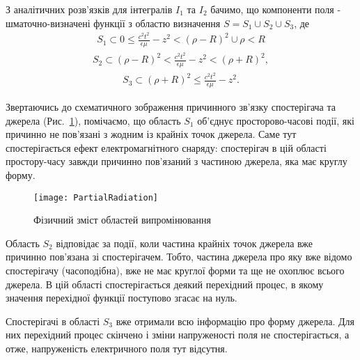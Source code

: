 З аналітичних розв'язків для інтегралів $ I_1 $ та $ I_2 $ бачимо, що 
компоненти поля - шматочно-визначені функції з областю визначення 
$ S = S_1 \cup S_2 \cup S_3 $, де
%
\begin{equation} \begin{aligned} \label{eq:s1zone}
S_1 \subset 0 \leq \frac{c^2t^2}{\epsilon \mu} - z^2 < (\rho - R)^2 
\cup \rho < R
\end{aligned} \end{equation}
%
\begin{equation} \begin{aligned} \label{eq:s2zone}
S_2 \subset (\rho - R)^2 < \frac{c^2t^2}{\epsilon \mu} - z^2 < (\rho + R)^2,
\end{aligned} \end{equation}
%
\begin{equation} \begin{aligned} \label{eq:s3zone}
S_3 \subset (\rho + R)^2 \leq \frac{c^2t^2}{\epsilon \mu} - z^2.
\end{aligned} \end{equation}

Звертаючись до схематичного зображення причинного зв'язку спостерігача та 
джерела (Рис.~\ref{fig:part_rad}), помічаємо, що область $ S_1 $ об'єднує 
просторово-часові події, які причинно не пов'язані з жодним із крайніх точок 
джерела. Саме тут спостерігається ефект електромагнітного снаряду: 
спостерігач в цій області простору-часу завжди причинно пов'язаний з 
частиною джерела, яка має круглу форму.

\begin{figure}[h] \begin{center}
\texttt{[image: PartialRadiation]}
\caption{Фізичний зміст областей випромінювання} \label{fig:part_rad}
\end{center} \end{figure}

Область $ S_2 $ відповідає за події, коли частина крайніх точок джерела вже 
причинно пов'язана зі спостерігачем. Тобто, частина джерела про яку вже відомо
спостерігачу (часоподібна), вже не має круглої форми та ще не охоплює 
всього джерела. В цій області спостерігається деякий перехідний процес, в
якому значення перехідної функції поступово згасає на нуль.

Спостерігачі в області $ S_3 $ вже отримали всю інформацію про форму джерела.
Для них перехідний процес скінчено і зміни напруженості поля не 
спостерігається, а отже, напруженість електричного поля тут відсутня.

